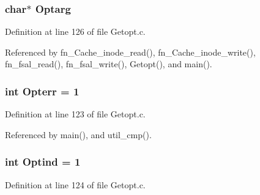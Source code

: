 \subsubsection{\setlength{\rightskip}{0pt plus 5cm}char$\ast$ {\bf Optarg}}\label{Getopt_8c_a6}




Definition at line 126 of file Getopt.c.

Referenced by fn\_\-Cache\_\-inode\_\-read(), fn\_\-Cache\_\-inode\_\-write(), fn\_\-fsal\_\-read(), fn\_\-fsal\_\-write(), Getopt(), and main().
\subsubsection{\setlength{\rightskip}{0pt plus 5cm}int {\bf Opterr} = 1}\label{Getopt_8c_a3}




Definition at line 123 of file Getopt.c.

Referenced by main(), and util\_\-cmp().
\subsubsection{\setlength{\rightskip}{0pt plus 5cm}int {\bf Optind} = 1}\label{Getopt_8c_a4}




Definition at line 124 of file Getopt.c.

